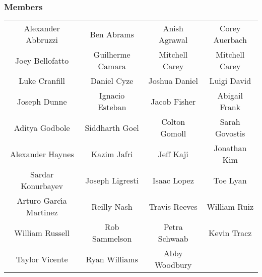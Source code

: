 \subsubsection*{Members}
\begin{table*}[htbp!]\small
    \centering
    \begin{tabular}{cccc}
        Alexander Abbruzzi & Ben Abrams & Anish Agrawal & Corey Auerbach \\
        Joey Bellofatto & Guilherme Camara & Mitchell Carey & Mitchell Carey \\
        Luke Cranfill & Daniel Cyze & Joshua Daniel & Luigi David \\
        Joseph Dunne & Ignacio Esteban & Jacob Fisher & Abigail Frank \\
        Aditya Godbole & Siddharth Goel & Colton Gomoll & Sarah Govostis \\
        Alexander Haynes & Kazim Jafri & Jeff Kaji & Jonathan Kim \\
        Sardar Konurbayev & Joseph Ligresti & Isaac Lopez & Toe Lyan \\
        Arturo Garc\'{\i}­a Martinez & Reilly Nash & Travis Reeves & William Ruiz \\
        William Russell & Rob Sammelson & Petra Schwaab & Kevin Tracz \\
        Taylor Vicente & Ryan Williams & Abby Woodbury &
    \end{tabular}
\end{table*}
